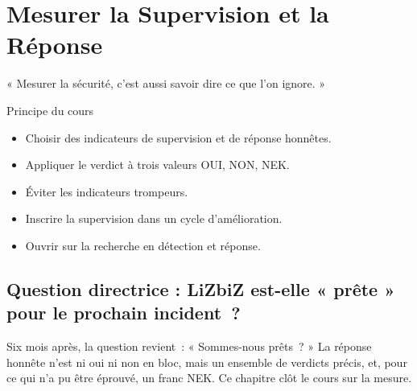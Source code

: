 
\chapter{Mesurer la Supervision et la Réponse}
\label{chap:mesurer}

\epigraph{%
    « Mesurer la sécurité, c'est aussi savoir dire ce que l'on ignore. »%
}{Principe du cours}


\begin{boxobjectifs}
\begin{itemize}
    \item Choisir des indicateurs de supervision et de réponse honnêtes.
    \item Appliquer le verdict à trois valeurs OUI, NON, NEK.
    \item Éviter les indicateurs trompeurs.
    \item Inscrire la supervision dans un cycle d'amélioration.
    \item Ouvrir sur la recherche en détection et réponse.
\end{itemize}
\end{boxobjectifs}

\bigskip

\section*{Question directrice : LiZbiZ est-elle « prête » pour le prochain incident~?}

Six mois après, la question revient~: « Sommes-nous prêts~? » La réponse
honnête n'est ni oui ni non en bloc, mais un ensemble de verdicts précis, et,
pour ce qui n'a pu être éprouvé, un franc NEK. Ce chapitre clôt le cours sur
la mesure.

